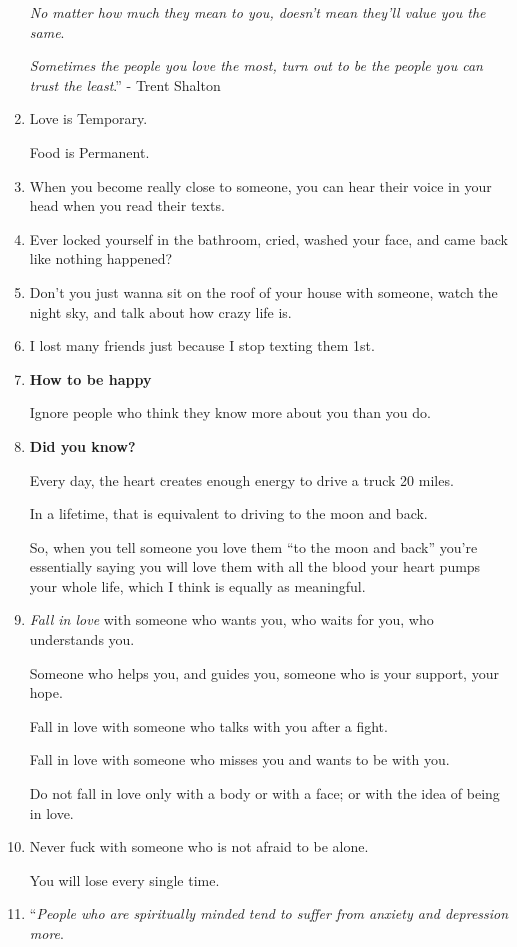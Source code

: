 \documentclass{article}
\begin{document}
\begin{enumerate}
	\textit{No matter how much they mean to you, doesn't mean they'll value you the same}.
	
	\textit{Sometimes the people you love the most, turn out to be the people you can trust the least}.'' - Trent Shalton
	\item Love is Temporary.
	
	Food is Permanent.
	\item When you become really close to someone, you can hear their voice in your head when you read their texts.
	\item Ever locked yourself in the bathroom, cried, washed your face, and came back like nothing happened?
	\item Don't you just wanna sit on the roof of your house with someone, watch the night sky, and talk about how crazy life is.
	\item I lost many friends just because I stop texting them 1st.
	\item \textbf{How to be happy}
	
	Ignore people who think they know more about you than you do.
	\item \textbf{Did you know?}
	
	Every day, the heart creates enough energy to drive a truck 20 miles.
	
	In a lifetime, that is equivalent to driving to the moon and back.
	
	So, when you tell someone you love them ``to the moon and back'' you're essentially saying you will love them with all the blood your heart pumps your whole life, which I think is equally as meaningful.
	\item \textit{Fall in love} with someone who wants you, who waits for you, who understands you.
	
	Someone who helps you, and guides you, someone who is your support, your hope.
	
	Fall in love with someone who talks with you after a fight.
	
	Fall in love with someone who misses you and wants to be with you.
	
	Do not fall in love only with a body or with a face; or with the idea of being in love.
	\item Never fuck with someone who is not afraid to be alone.
	
	You will lose every single time.
	\item ``\textit{People who are spiritually minded tend to suffer from anxiety and depression more}.
	

\end{enumerate}
\end{document}
